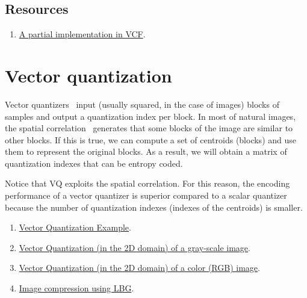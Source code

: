 \subsection*{Resources}

\begin{enumerate}
\item
  \href{https://github.com/Sistemas-Multimedia/VCF/blob/main/src/LloydMax.py}{A
    partial implementation in VCF}.
\end{enumerate}

\section{Vector quantization}

Vector quantizers~\cite{vruiz__vector_quantization} input (usually
squared, in the case of images) blocks of samples and output a
quantization index per block. In most of natural images, the spatial
correlation~\cite{vruiz__visual_redundancy} generates that some blocks
of the image are similar to other blocks. If this is true, we can
compute a set of centroids (blocks) and use them to represent the
original blocks. As a result, we will obtain a matrix of quantization
indexes that can be entropy coded.

Notice that VQ exploits the spatial correlation. For this reason, the
encoding performance of a vector quantizer is superior compared to a
scalar quantizer because the number of quantization indexes (indexes
of the centroids) is smaller.

\begin{enumerate}
\item
  \href{https://scikit-learn.org/stable/auto_examples/cluster/plot_face_compress.html#sphx-glr-auto-examples-cluster-plot-face-compress-py}{Vector
    Quantization Example}.
\item
  \href{https://github.com/vicente-gonzalez-ruiz/vector_quantization/blob/main/docs/gray_VQ.ipynb}{Vector
    Quantization (in the 2D domain) of a gray-scale image}.
\item
  \href{https://github.com/vicente-gonzalez-ruiz/vector_quantization/blob/main/docs/spatial_color_VQ.ipynb}{Vector
    Quantization (in the 2D domain) of a color (RGB) image}.
  
\item \href{https://github.com/droidadroit/LBG}{Image compression using LBG}.
\end{enumerate}

